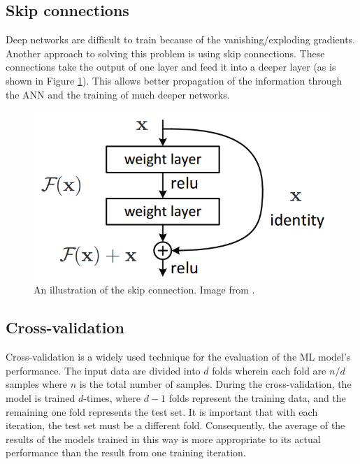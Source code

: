 \documentclass[thesis=B,english]{FITthesis}[2019/12/23]
\begin{document}
\subsection{Skip connections}
Deep networks are difficult to train because of the vanishing/exploding gradients. Another approach to solving this problem is using skip connections. These connections take the output of one layer and feed it into a deeper layer (as is shown in Figure \ref{fig:dropout}). This allows better propagation of the information through the ANN and the training of much deeper networks.\cite{DBLP:journals/corr/HeZRS15}

\begin{figure}[ht]
		\includegraphics[scale=0.3]{images/skip_connection.png}
		\centering
		\caption{An illustration of the skip connection. Image from \cite{DBLP:journals/corr/HeZRS15}.}
		\label{fig:dropout}
\end{figure}

\subsection{Cross-validation}
Cross-validation is a widely used technique for the evaluation of the ML model's performance. The input data are divided into $d$ folds wherein each fold are $n/d$ samples where $n$ is the total number of samples. During the cross-validation, the model is trained $d$-times, where $d-1$ folds represent the training data, and the remaining one fold represents the test set. It is important that with each iteration, the test set must be a different fold. Consequently, the average of the results of the models trained in this way is more appropriate to its actual performance than the result from one training iteration.
\end{document}

